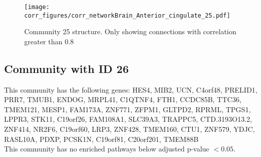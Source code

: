 \begin{figure}[h!]
\centering
\texttt{[image: corr\_figures/corr\_networkBrain\_Anterior\_cingulate\_25.pdf]}
\caption{Community 25 structure. Only showing connections with correlation greater than 0.8}
\end{figure}




\subsection*{Community with ID 26}
This community has the following genes: HES4, MIB2, UCN, C4orf48, PRELID1, PRR7, TMUB1, ENDOG, MRPL41, C1QTNF4, FTH1, CCDC85B, TTC36, TMEM121, MESP1, FAM173A, ZNF771, ZFPM1, GLTPD2, RPRML, TPGS1, LPPR3, STK11, C19orf26, FAM108A1, SLC39A3, TRAPPC5, CTD.3193O13.2, ZNF414, NR2F6, C19orf60, LRP3, ZNF428, TMEM160, CTU1, ZNF579, YDJC, RASL10A, PDXP, PCSK1N, C19orf81, C20orf201, TMEM88B
\\
This community has no enriched pathways below adjusted p-value $< 0.05$.

